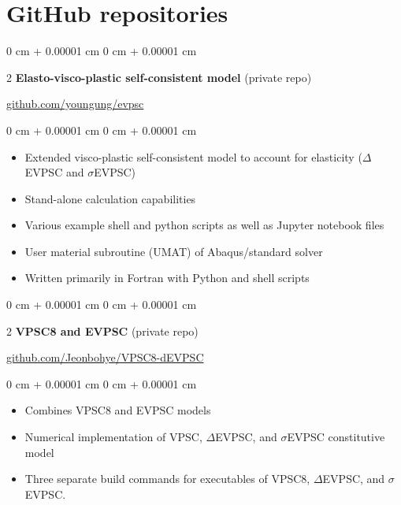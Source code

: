 \documentclass[10pt, letterpaper]{article}
\newenvironment{highlights}{
    \begin{itemize}[
        topsep=0.10 cm,
        parsep=0.10 cm,
        partopsep=0pt,
        itemsep=0pt,
        leftmargin=0 cm + 10pt
    ]
}{
    \end{itemize}
} %
\newenvironment{onecolentry}{
    \begin{adjustwidth}{
        0 cm + 0.00001 cm
    }{
        0 cm + 0.00001 cm
    }
}{
    \end{adjustwidth}
} %
\newenvironment{twocolentry}[2][]{
    \onecolentry
    \def\secondColumn{#2}
    \setcolumnwidth{\fill, 4.5 cm}
    \begin{paracol}{2}
}{
    \switchcolumn \raggedleft \secondColumn
    \end{paracol}
    \endonecolentry
} %
\begin{document}
    \section{GitHub repositories}
        \begin{twocolentry}{\href{https://github.com/youngung/evpsc}{github.com/youngung/evpsc}}\textbf{Elasto-visco-plastic self-consistent model} (private repo)
        \end{twocolentry}
        \vspace{0.10 cm}
        \begin{onecolentry}
            \begin{highlights}
                \item Extended visco-plastic self-consistent model to account for elasticity ($\Delta$EVPSC and $\sigma$EVPSC)
                \item Stand-alone calculation capabilities
                \item Various example shell and python scripts as well as Jupyter notebook files
                \item User material subroutine (UMAT) of Abaqus/standard solver
                \item Written primarily in Fortran with Python and shell scripts
            \end{highlights}
        \end{onecolentry}
        \vspace{0.4 cm}

        \begin{twocolentry}{\href{https://github.com/Jeonbohye/VPSC8-dEVPSC}{github.com/Jeonbohye/VPSC8-dEVPSC}}\textbf{VPSC8 and EVPSC} (private repo)
        \end{twocolentry}
        \begin{onecolentry}
            \begin{highlights}
                \item Combines VPSC8 and EVPSC models
                \item Numerical implementation of VPSC, $\Delta$EVPSC, and $\sigma$EVPSC constitutive model
                \item Three separate build commands for executables of VPSC8, $\Delta$EVPSC, and $\sigma$EVPSC.
            \end{highlights}
        \end{onecolentry}
        \vspace{0.4 cm}
\end{document}
